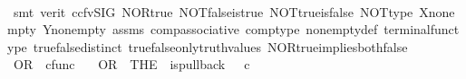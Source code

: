 \begin{isabellebody}
%
\isadelimproof
\ \ %
\endisadelimproof
%
\isatagproof
{}\isamarkupfalse%
\ {\isacharparenleft}{\kern0pt}smt\ {\isacharparenleft}{\kern0pt}verit{\isacharcomma}{\kern0pt}\ ccfv{\isacharunderscore}{\kern0pt}SIG{\isacharparenright}{\kern0pt}\ NOR{\isacharunderscore}{\kern0pt}true\ NOT{\isacharunderscore}{\kern0pt}false{\isacharunderscore}{\kern0pt}is{\isacharunderscore}{\kern0pt}true\ NOT{\isacharunderscore}{\kern0pt}true{\isacharunderscore}{\kern0pt}is{\isacharunderscore}{\kern0pt}false\ NOT{\isacharunderscore}{\kern0pt}type\ X{\isacharunderscore}{\kern0pt}nonempty\ Y{\isacharunderscore}{\kern0pt}nonempty\ assms{\isacharparenleft}{\kern0pt}{}{\isacharcomma}{\kern0pt}{}{\isacharparenright}{\kern0pt}\ comp{\isacharunderscore}{\kern0pt}associative{}\ comp{\isacharunderscore}{\kern0pt}type\ nonempty{\isacharunderscore}{\kern0pt}def\ terminal{\isacharunderscore}{\kern0pt}func{\isacharunderscore}{\kern0pt}type\ true{\isacharunderscore}{\kern0pt}false{\isacharunderscore}{\kern0pt}distinct\ true{\isacharunderscore}{\kern0pt}false{\isacharunderscore}{\kern0pt}only{\isacharunderscore}{\kern0pt}truth{\isacharunderscore}{\kern0pt}values\ NOR{\isacharunderscore}{\kern0pt}true{\isacharunderscore}{\kern0pt}implies{\isacharunderscore}{\kern0pt}both{\isacharunderscore}{\kern0pt}false{\isacharparenright}{\kern0pt}%
\endisatagproof
{\isafoldproof}%
%
\isadelimproof
%
\endisadelimproof
%
\isadelimdocument
%
\endisadelimdocument
%
\isatagdocument
%
\isamarkuptrue%
%
\endisatagdocument
{\isafolddocument}%
%
\isadelimdocument
%
\endisadelimdocument
{}\isamarkupfalse%
\ OR\ {\isacharcolon}{\kern0pt}{\isacharcolon}{\kern0pt}\ {\isachardoublequoteopen}cfunc{\isachardoublequoteclose}\ \isanewline
\ \ {\isachardoublequoteopen}OR\ {\isacharequal}{\kern0pt}\ {\isacharparenleft}{\kern0pt}THE\ {\isasymchi}{\isachardot}{\kern0pt}\ is{\isacharunderscore}{\kern0pt}pullback\ {\isacharparenleft}{\kern0pt}{\isasymone}{\isasymCoprod}{\isacharparenleft}{\kern0pt}{\isasymone}{\isasymCoprod}{\isasymone}{\isacharparenright}{\kern0pt}{\isacharparenright}{\kern0pt}\ {\isasymone}\ {\isacharparenleft}{\kern0pt}{\isasymOmega}{\isasymtimes}\isactrlsub c{\isasymOmega}{\isacharparenright}{\kern0pt}\ {\isasymOmega}\ {\isacharparenleft}{\kern0pt}{\isasymbeta}\isactrlbsub {\isacharparenleft}{\kern0pt}{\isasymone}{\isasymCoprod}{\isacharparenleft}{\kern0pt}{\isasymone}{\isasymCoprod}{\isasymone}{\isacharparenright}{\kern0pt}{\isacharparenright}{\kern0pt}\isactrlesub {\isacharparenright}{\kern0pt}\ {\isasymt}\ {\isacharparenleft}{\kern0pt}{\isasymlangle}{\isasymt}{\isacharcomma}{\kern0pt}\ {\isasymt}{\isasymrangle}{\isasymamalg}\ {\isacharparenleft}{\kern0pt}{\isasymlangle}{\isasymt}{\isacharcomma}{\kern0pt}\ {\isasymf}{\isasymrangle}\ {\isasymamalg}{\isasymlangle}{\isasymf}{\isacharcomma}{\kern0pt}\ {\isasymt}{\isasymrangle}{\isacharparenright}{\kern0pt}{\isacharparenright}{\kern0pt}\ {\isasymchi}{\isacharparenright}{\kern0pt}{\isachardoublequoteclose}\isanewline

\end{isabellebody}

